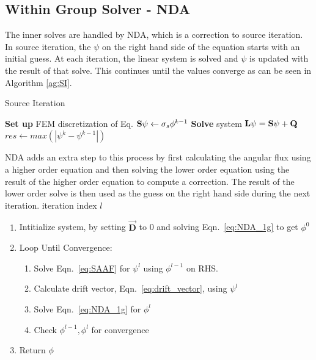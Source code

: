 \subsection{Within Group Solver - NDA}
The inner solves are handled by NDA, which is a correction to source iteration. In source iteration, the $\psi$ on the right hand side of the equation starts with an initial guess. At each iteration, the linear system is solved and $\psi$ is updated with the result of that solve. This continues until the values converge as can be seen in Algorithm \ref{ag:SI}.
\begin{algorithm}
\caption{Source Iteration}
\begin{algorithmic}
 
    \State \textbf{Set up} FEM discretization of Eq.
    \State ${\bf S} \psi \gets \sigma_s \phi^{k-1}$ 
    \State \textbf{Solve} system $\textbf{L}\psi= {\bf S}\psi + {\bf Q}$
    \State $res \gets max(|\psi^{k} - \psi^{k-1}|)$
\EndWhile
\end{algorithmic}
\label{ag:SI}
\end{algorithm}

NDA adds an extra step to this process by first calculating the angular flux using a higher order equation and then solving the lower order equation using the result of the higher order equation to compute a correction. The result of the lower order solve is then used as the guess on the right hand side during the next iteration.  \DIFdelbegin %
\DIFdelend \DIFaddbegin {}\DIFaddend iteration index $l$ \DIFdelbegin \DIFdel{: 
}%

\DIFdelend \DIFaddbegin {}\DIFaddend \begin{enumerate}
    \item Intitialize system, by setting $\vec{\textbf{D}}$ to 0 and solving Eqn.~\eqref{eq:NDA_1g} to get $\phi^0$ 
    \item Loop Until Convergence:
        \begin{enumerate}
            \item Solve Eqn.~\eqref{eq:SAAF} for $\psi^l$ using $\phi^{l-1}$ on RHS.
            \item Calculate drift vector, Eqn.~\eqref{eq:drift_vector}, using $\psi^l$
            \item Solve Eqn.~\eqref{eq:NDA_1g} for $\phi^l$
            \item Check $\phi^{l-1}, \phi^l$ for convergence
        \end{enumerate}
    \item Return $\phi$
\end{enumerate}


